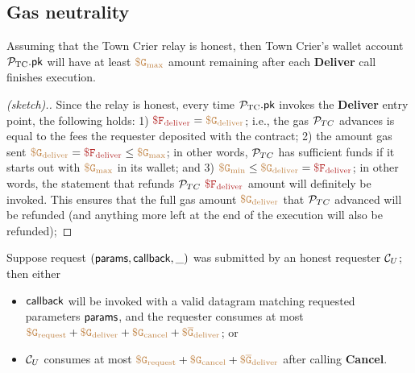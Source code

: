 \subsection{Gas neutrality}

\begin{theorem}
Assuming that the Town Crier relay is honest, 
then Town Crier's wallet account ${\mathcal{P}}_{\text{TC}}.{\sf pk}$ 
will have at least $\tt {\color{brown} \$ G_{\text{max}} }$
amount remaining after each {\bf Deliver}  
call finishes execution.
\end{theorem}
\begin{proof}[(sketch).]
Since the relay is honest, every time 
${\mathcal{P}}_{\text{TC}}.{\sf pk}$ invokes the {\bf Deliver}
entry point, the following holds:
1) 
$\smaroon{\$ F_{\text{deliver}}}
= \sbrown{\$ G_{\text{deliver}}}$;
i.e., the gas ${\cal P}_{TC}$ advances is equal
to the fees the 
requester deposited with the \tcont contract;
2)
the amount gas sent 
$\sbrown{\$ G_{\text{deliver}}} = 
\smaroon{\$ F_{\text{deliver}}}
\leq 
\sbrown{\$ G_{\text{max}}} 
$;
in other words, 
${\cal P}_{TC}$ has sufficient funds  
if it starts out with $\tt {\color{brown} \$ G_{\text{max}} }$
in its wallet;
and
3) 
$\sbrown{\$ G_{\text{min}}} \leq
\sbrown{\$ G_{\text{deliver}}} = 
\smaroon{\$ F_{\text{deliver}}}
$; in other words, the statement that refunds
${\cal P}_{TC}$ 
$\smaroon{\$ F_{\text{deliver}}}$
amount will definitely be invoked. This 
ensures that the full gas amount 
$\tt {\color{brown} \$ G_{\text{deliver}} }$
that ${\cal P}_{TC}$ advanced will be refunded (and anything more left
at the end of the execution will also be refunded);
\end{proof}





\begin{theorem}
Suppose request $({\sf params}, {\sf callback}, \_)$ was submitted
by an honest requester ${\cal C}_U$;
then 
either 
\begin{itemize}
\item ${\sf callback}$ will be invoked  
with a valid datagram matching requested parameters
${\sf params}$,
and the requester consumes at most
$\tt {\color{brown} \$ G_{\text{request}} } + \tt {\color{brown} \$ G_{\text{deliver}} } + 
\tt {\color{brown} \$ {G}_{\text{cancel}} }
+ \tt {\color{brown} \$ \overline{G}_{\text{deliver}} }$;
or 
\item
${\cal C}_U$ 
consumes at most 
$\tt {\color{brown} \$ G_{\text{request}} } + \tt {\color{brown} \$ G_{\text{cancel}} } + 
\tt {\color{brown} \$ \overline{G}_{\text{deliver}} }$ after calling {\bf Cancel}.
\end{itemize}
\end{theorem}

